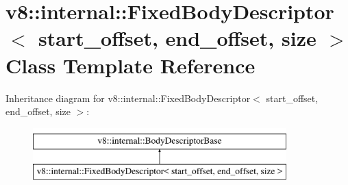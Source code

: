 \hypertarget{classv8_1_1internal_1_1FixedBodyDescriptor}{}\section{v8\+:\+:internal\+:\+:Fixed\+Body\+Descriptor$<$ start\+\_\+offset, end\+\_\+offset, size $>$ Class Template Reference}
\label{classv8_1_1internal_1_1FixedBodyDescriptor}
Inheritance diagram for v8\+:\+:internal\+:\+:Fixed\+Body\+Descriptor$<$ start\+\_\+offset, end\+\_\+offset, size $>$\+:\begin{figure}[H]
\begin{center}
\leavevmode
\includegraphics[height=2.000000cm]{classv8_1_1internal_1_1FixedBodyDescriptor}
\end{center}
\end{figure}
